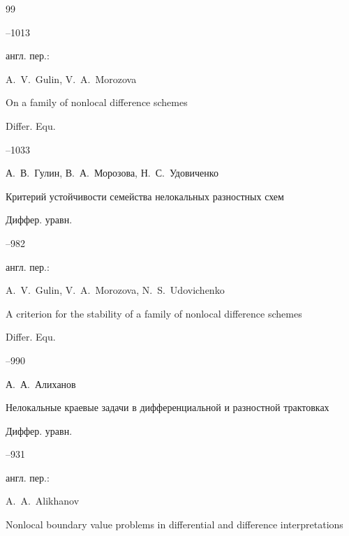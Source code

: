 \begin{thebibliography}{99}


--1013

\transl англ. пер.:~

\by A.~V.~Gulin,  V.~A.~Morozova 

\paper On a family of nonlocal difference schemes

\jour Differ. Equ. 




–1033








\by А.~В.~Гулин, В.~А.~Морозова, Н.~С.~Удовиченко

\paper Критерий устойчивости семейства нелокальных разностных схем 

\jour Диффер. уравн.




--982

\transl англ. пер.:~

\by  A.~V.~Gulin,  V.~A.~Morozova, N.~S.~Udovichenko 

\paper A criterion for the stability of a family of nonlocal difference schemes

\jour Differ. Equ.




–990 






\by А.~А.~Алиханов

\paper Нелокальные краевые задачи в дифференциальной и разностной трактовках 

\jour Диффер. уравн.




--931

\transl англ. пер.:~

\by A.~A.~Alikhanov 

\paper Nonlocal boundary value problems in differential and difference interpretations


\end{thebibliography}
